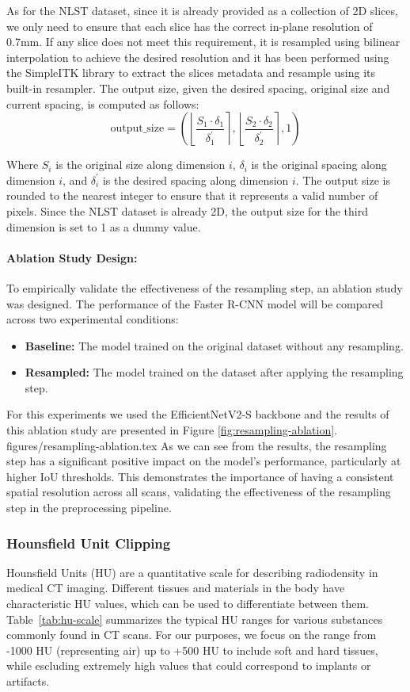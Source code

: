 As for the NLST dataset, since it is already provided as a collection of 2D slices, we only need to ensure that each slice has the correct in-plane resolution of 0.7mm. If any slice does not meet this requirement, it is resampled using bilinear interpolation to achieve the desired resolution and it has been performed using the SimpleITK library \cite{lowekamp2013simpleitk} to extract the slices metadata and resample using its built-in resampler. The output size, given the desired spacing, original size and current spacing, is computed as follows:
$$
\text{output\_size} = \left( \left\lfloor\frac{S_1 \cdot \delta_1}{\delta_1^\prime}\right\rceil, \left\lfloor\frac{S_2 \cdot \delta_2}{\delta_2^\prime}\right\rceil, 1 \right)
$$

Where \(S_i\) is the original size along dimension \(i\), \(\delta_i\) is the original spacing along dimension \(i\), and \(\delta_i^\prime\) is the desired spacing along dimension \(i\). The output size is rounded to the nearest integer to ensure that it represents a valid number of pixels. Since the NLST dataset is already 2D, the output size for the third dimension is set to 1 as a dummy value.

\paragraph{Ablation Study Design:}
To empirically validate the effectiveness of the resampling step, an ablation study was designed. The performance of the Faster R-CNN model will be compared across two experimental conditions: 
\begin{itemize}
    \item \textbf{Baseline:} The model trained on the original dataset without any resampling.
    \item \textbf{Resampled:} The model trained on the dataset after applying the resampling step.
\end{itemize}
For this experiments we used the EfficientNetV2-S backbone and the results of this ablation study are presented in Figure \ref{fig:resampling-ablation}.
 {figures/resampling-ablation.tex}
As we can see from the results, the resampling step has a significant positive impact on the model's performance, particularly at higher IoU thresholds. This demonstrates the importance of having a consistent spatial resolution across all scans, validating the effectiveness of the resampling step in the preprocessing pipeline.

\subsubsection{Hounsfield Unit Clipping}
\label{sec:hu-clipping}
Hounsfield Units (HU) are a quantitative scale for describing radiodensity in medical CT imaging. Different tissues and materials in the body have characteristic HU values, which can be used to differentiate between them. Table~\ref{tab:hu-scale} summarizes the typical HU ranges for various substances commonly found in CT scans. For our purposes, we focus on the range from -1000 HU (representing air) up to +500 HU to include soft and hard tissues, while escluding extremely high values that could correspond to implants or artifacts.


